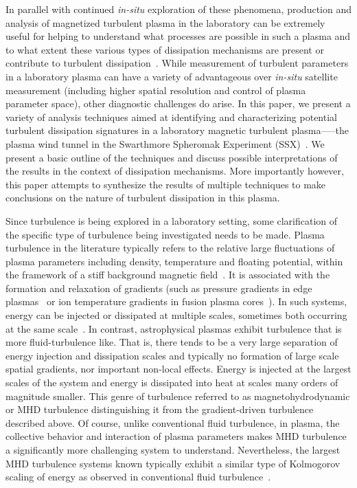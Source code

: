 \documentclass[aip,pop,amsmath,amssymb,preprint,superscriptaddress]{revtex4-1} %
\begin{document}
In parallel with continued \textit{in-situ} exploration of these phenomena, production and analysis of magnetized turbulent plasma in the laboratory can be extremely useful for helping to understand what processes are possible in such a plasma and to what extent these various types of dissipation mechanisms are present or contribute to turbulent dissipation~\cite{schaffner2014a,schaffner2014c}. While measurement of turbulent parameters in a laboratory plasma can have a variety of advantageous over \textit{in-situ} satellite measurement (including higher spatial resolution and control of plasma parameter space), other diagnostic challenges do arise.  In this paper, we present a variety of analysis techniques aimed at identifying and characterizing potential turbulent dissipation signatures in a laboratory magnetic turbulent plasma—--the plasma wind tunnel in the Swarthmore Spheromak Experiment (SSX)~\cite{brown2014,brown2015a}. We present a basic outline of the techniques and discuss possible interpretations of the results in the context of dissipation mechanisms. More importantly however, this paper attempts to synthesize the results of multiple techniques to make conclusions on the nature of turbulent dissipation in this plasma.

Since turbulence is being explored in a laboratory setting, some clarification of the specific type of turbulence being investigated needs to be made. Plasma turbulence in the literature typically refers to the relative large fluctuations of plasma parameters including density, temperature and floating potential, within the framework of a stiff background magnetic field~\cite{brown2014}. It is associated with the formation and relaxation of gradients (such as pressure gradients in edge plasmas~\cite{zweben2007} or ion temperature gradients in fusion plasma cores~\cite{ghim2014}). In such systems, energy can be injected or dissipated at multiple scales, sometimes both occurring at the same scale~\cite{hatch2011}. In contrast, astrophysical plasmas exhibit turbulence that is more fluid-turbulence like. That is, there tends to be a very large separation of energy injection and dissipation scales and typically no formation of large scale spatial gradients, nor important non-local effects. Energy is injected at the largest scales of the system and energy is dissipated into heat at scales many orders of magnitude smaller. This genre of turbulence  referred to as magnetohydrodynamic or MHD turbulence distinguishing it from the gradient-driven turbulence described above. Of course, unlike conventional fluid turbulence, in plasma, the collective behavior and interaction of plasma parameters makes MHD turbulence a significantly more challenging system to understand. Nevertheless, the largest MHD turbulence systems known typically exhibit a similar type of Kolmogorov scaling of energy as observed in conventional fluid turbulence~\cite{sahraoui2009}. 
\end{document}
